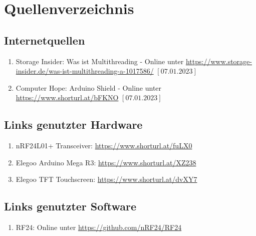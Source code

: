 \documentclass[a4paper, 11pt]{scrartcl}
\begin{document}
\section{Quellenverzeichnis}
\subsection{Internetquellen}
\begin{enumerate}
    \item Storage Insider: Was ist Multithreading - Online unter \url{https://www.storage-insider.de/was-ist-multithreading-a-1017586/} $\left[\text{07.01.2023}\right]$ \label{itm:multithread}
    \item Computer Hope: Arduino Shield - Online unter \url{https://www.shorturl.at/bFKNO} $\left[\text{07.01.2023}\right]$ \label{itm:shield}
\end{enumerate}

\subsection{Links genutzter Hardware}\label{ch:hardwarelinks}
\begin{enumerate}
    \item nRF24L01+ Transceiver: \url{https://www.shorturl.at/fuLX0}\label{itm:transceiverlink}
    \item Elegoo Arduino Mega R3: \url{https://www.shorturl.at/XZ238}\label{itm:arduinolink}
    \item Elegoo TFT Touchscreen: \url{https://www.shorturl.at/dvXY7}\label{itm:tftlink}
\end{enumerate}

\subsection{Links genutzter Software}\label{ch:softwarelinks}
\begin{enumerate}
    \item RF24: Online unter \url{https://github.com/nRF24/RF24}\label{link:rf24}
\end{enumerate}
\end{document}
